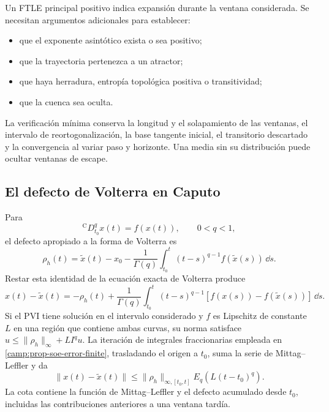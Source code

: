 Un FTLE principal positivo indica expansión durante la ventana considerada.
Se necesitan argumentos adicionales para establecer:
\begin{itemize}
 \item que el exponente asintótico exista o sea positivo;
 \item que la trayectoria pertenezca a un atractor;
 \item que haya herradura, entropía topológica positiva o transitividad;
 \item que la cuenca sea oculta.
\end{itemize}
La verificación mínima conserva la longitud y el solapamiento de las ventanas,
el intervalo de reortogonalización, la base tangente inicial, el transitorio
descartado y la convergencia al variar paso y horizonte. Una media sin su
distribución puede ocultar ventanas de escape.

\subsection{El defecto de Volterra en Caputo}

Para
\begin{equation}
 {}^{\mathrm C}D_{t_0}^{q}x(t)=f(x(t)),\qquad 0<q<1,
 \label{eq:reliability-caputo}
\end{equation}
el defecto apropiado a la forma de Volterra es
\begin{equation}
 \rho_h(t)=\widetilde x(t)-x_0
 -\frac1{\Gamma(q)}
 \int_{t_0}^{t}(t-s)^{q-1}f(\widetilde x(s))\,\dd s .
 \label{eq:reliability-volterra-defect}
\end{equation}
Restar esta identidad de la ecuación exacta de Volterra produce
\[
 x(t)-\widetilde x(t)=-\rho_h(t)+\frac1{\Gamma(q)}
 \int_{t_0}^t(t-s)^{q-1}[f(x(s))-f(\widetilde x(s))]\,\dd s.
\]
Si el PVI tiene solución en el intervalo considerado y \(f\) es Lipschitz
de constante \(L\) en una región que contiene ambas curvas, su norma satisface
\(u\leq\|\rho_h\|_\infty+LI^qu\). La iteración de integrales fraccionarias
empleada en \cref{camp:prop-soe-error-finite}, trasladando el origen a \(t_0\),
suma la serie de Mittag--Leffler y da
\cite{Lin2013GeneralizedGronwall}
\begin{equation}
 \|x(t)-\widetilde x(t)\|
 \leq
 \|\rho_h\|_{\infty,[t_0,t]}
 E_q\!\left(L(t-t_0)^q\right).
 \label{eq:reliability-fractional-gronwall}
\end{equation}
La cota contiene la función de Mittag--Leffler y el defecto acumulado desde
\(t_0\), incluidas las contribuciones anteriores a una ventana tardía.

